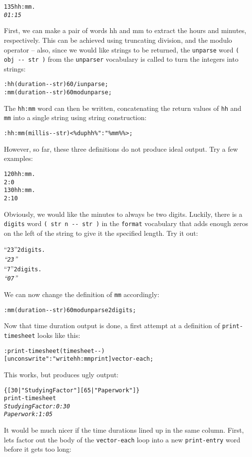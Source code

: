 \documentclass[english]{article}
\begin{document}
\begin{alltt}
135 hh:mm .
\emph{01:15}
\end{alltt}
First, we can make a pair of words hh and mm to extract the hours
and minutes, respectively. This can be achieved using truncating division,
and the modulo operator -- also, since we would like strings to be
returned, the \texttt{unparse} word \texttt{( obj -{}- str )} from
the \texttt{unparser} vocabulary is called to turn the integers into
strings:

\begin{alltt}
: hh ( duration -{}- str ) 60 /i unparse ;
: mm ( duration -{}- str ) 60 mod unparse ;
\end{alltt}
The \texttt{hh:mm} word can then be written, concatenating the return
values of \texttt{hh} and \texttt{mm} into a single string using string
construction:

\begin{alltt}
: hh:mm ( millis -{}- str ) <\% dup hh \% ":" \% mm \% \%> ;
\end{alltt}
However, so far, these three definitions do not produce ideal output.
Try a few examples:

\begin{alltt}
120 hh:mm .
2:0
130 hh:mm .
2:10
\end{alltt}
Obviously, we would like the minutes to always be two digits. Luckily,
there is a \texttt{digits} word \texttt{( str n -{}- str )} in the
\texttt{format} vocabulary that adds enough zeros on the left of the
string to give it the specified length. Try it out:

\begin{alltt}
{}``23'' 2 digits .
\emph{{}``23''}
{}``7'' 2 digits .
\emph{{}``07''}
\end{alltt}
We can now change the definition of \texttt{mm} accordingly:

\begin{alltt}
: mm ( duration -{}- str ) 60 mod unparse 2 digits ;
\end{alltt}
Now that time duration output is done, a first attempt at a definition
of \texttt{print-timesheet} looks like this:

\begin{alltt}
: print-timesheet ( timesheet -{}- )
    {[} uncons write ": " write hh:mm print {]} vector-each ;
\end{alltt}
This works, but produces ugly output:

\begin{alltt}
\{ {[} 30 | "Studying Factor" {]} {[} 65 | "Paperwork" {]} \}
print-timesheet
\emph{Studying Factor: 0:30}
\emph{Paperwork: 1:05}
\end{alltt}
It would be much nicer if the time durations lined up in the same
column. First, lets factor out the body of the \texttt{vector-each}
loop into a new \texttt{print-entry} word before it gets too long:
\end{document}
